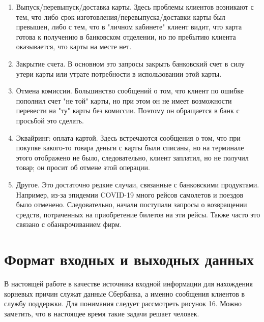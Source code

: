 \documentclass[a4paper,12pt,preview]{report} %
\begin{document}
	\begin{enumerate}
		\item Выпуск/перевыпуск/доставка карты. Здесь проблемы клиентов возникают с тем, что либо срок изготовления/перевыпуска/доставки карты был превышен, либо с тем, что в "личном кабинете" клиент видит, что карта готова к получению в банковском отделении, но по пребытию клиента оказывается, что карты на месте нет.
		
		\item Закрытие счета. В основном это запросы закрыть банковский счет в силу утери карты или утрате потребности в использовании этой карты.
		
		\item Отмена комиссии. Большинство сообщений о том, что клиент по ошибке пополнил счет "не той" карты, но при этом он не имеет возможности перевести на "ту" карты без комиссии. Поэтому он обращается в банк с просьбой это сделать.
		
		\item Эквайринг: оплата картой. Здесь встречаются сообщения о том, что при покупке какого-то товара деньги с карты были списаны, но на терминале этого отображено не было, следовательно, клиент заплатил, но не получил товар; он просит об отмене этой операции. 
		
		\item Другое. Это достаточно редкие случаи, связанные с банковскими продуктами. Например, из-за эпидемии COVID-19 много рейсов самолетов и поездов было отменено. Следовательно, начали поступали запросы о возвращении средств, потраченных на приобретение билетов на эти рейсы. Также часто это связано с обанкрочиванием фирм.
		
	\end{enumerate}
	
	\newpage
	
	\section{Формат входных и выходных данных}
	
	В настоящей работе в качестве источника входной информации для нахождения корневых причин служат данные Сбербанка, а именно сообщения клиентов в службу поддержки. Для понимания следует рассмотреть рисунок 16. Можно заметить, что в настоящее время такие задачи решает человек.
	
\end{document}
